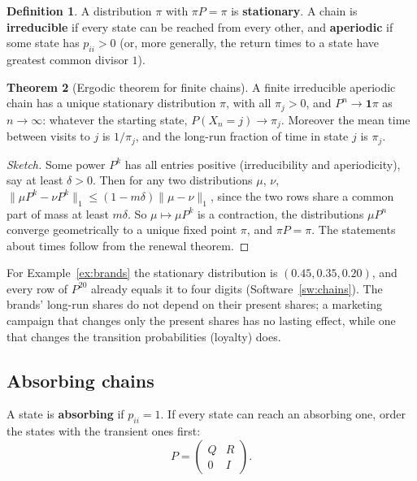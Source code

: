 \documentclass[11pt,a4paper]{article}
\numberwithin{equation}{section}
\theoremstyle{definition}
\newtheorem{thm}{Theorem}[subsection]
\newtheorem{defn}[thm]{Definition}
\begin{document}
\begin{defn}
A distribution $\pi$ with $\pi P = \pi$ is \textbf{stationary}. A chain is \textbf{irreducible} if every state can be reached from every other, and \textbf{aperiodic} if some state has $p_{ii} > 0$ (or, more generally, the return times to a state have greatest common divisor $1$).
\end{defn}

\begin{thm}[Ergodic theorem for finite chains]
\label{thm:ergodic}
A finite irreducible aperiodic chain has a unique stationary distribution $\pi$, with all $\pi_j > 0$, and $P^n \to \mathbf 1\pi$ as $n \to \infty$: whatever the starting state, $P(X_n = j) \to \pi_j$. Moreover the mean time between visits to $j$ is $1/\pi_j$, and the long-run fraction of time in state $j$ is $\pi_j$.
\end{thm}

\begin{proof}[Sketch]
Some power $P^k$ has all entries positive (irreducibility and aperiodicity), say at least $\delta > 0$. Then for any two distributions $\mu$, $\nu$, $\|\mu P^k - \nu P^k\|_1 \leq (1 - m\delta)\|\mu - \nu\|_1$, since the two rows share a common part of mass at least $m\delta$. So $\mu \mapsto \mu P^k$ is a contraction, the distributions
$\mu P^n$ converge geometrically to a unique fixed point $\pi$, and $\pi P = \pi$. The statements about times follow from the renewal theorem.
\end{proof}

For Example~\ref{ex:brands} the stationary distribution is $(0.45, 0.35, 0.20)$, and every row of $P^{20}$ already equals it to four digits (Software~\ref{sw:chains}). The brands' long-run shares do not depend on their present shares; a marketing campaign that changes only the present shares has no lasting effect, while one that changes the
transition probabilities (loyalty) does.

\subsection{Absorbing chains}
\label{ssec:absorbing}

A state is \textbf{absorbing} if $p_{ii} = 1$. If every state can reach an absorbing one, order the states with the transient ones first:
\[
P = \begin{pmatrix} Q & R \\ 0 & I \end{pmatrix} .
\]
\end{document}
